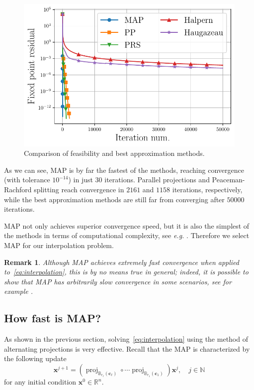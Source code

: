 \documentclass{article}
\DeclareMathOperator{\proj}{proj}
\newtheorem{remark}[theorem]{Remark}
\newcommand{\N}{\mathbb{N}}
\newcommand{\R}{\mathbb{R}}
\newcommand{\x}{\mathbold{x}}
\newcommand{\ball}[2]{\mathbb{B}_{#2}(#1)}
\newcommand{\cv}{\mathbold{c}}
\begin{document}
\begin{figure}[ht]
\vskip 0.2in
\begin{center}
\centerline{\includegraphics[width=\columnwidth]{Figures/comparison_projection_methods}}
\caption{Comparison of feasibility and best approximation methods.}
\label{fig:projection_methods}
\end{center}
\vskip -0.2in
\end{figure}

As we can see, MAP is by far the fastest of the methods, reaching convergence (with tolerance $10^{-14}$) in just $30$ iterations. Parallel projections and Peaceman-Rachford splitting reach convergence in $2161$ and $1158$ iterations, respectively, while the best approximation methods are still far from converging after $50000$ iterations.

MAP not only achieves superior convergence speed, but it is also the simplest of the methods in terms of computational complexity, see \emph{e.g.} \cite{reich_projection_2015}. Therefore we select MAP for our interpolation problem. 

\begin{remark}
Although MAP achieves extremely fast convergence when applied to~\eqref{eq:interpolation}, this is by no means true in general; indeed, it is possible to show that MAP has \emph{arbitrarily slow} convergence in some scenarios, see for example \cite{hundal_alternating_2004,bauschke_characterizing_2009}.
\end{remark}

\subsection{How fast is MAP?}
As shown in the previous section, solving~\eqref{eq:interpolation} using the method of alternating projections is very effective. Recall that the MAP is characterized by the following update
\begin{equation}\label{eq:alternating_projections}
	\x^{j+1} = (\proj_{\ball{\cv_{\ell}}{r_{\ell}}} \circ \cdots \proj_{\ball{\cv_1}{r_1}}) \x^j, \quad j \in \N
\end{equation}
for any initial condition $\x^0 \in \R^n$.
\end{document}
